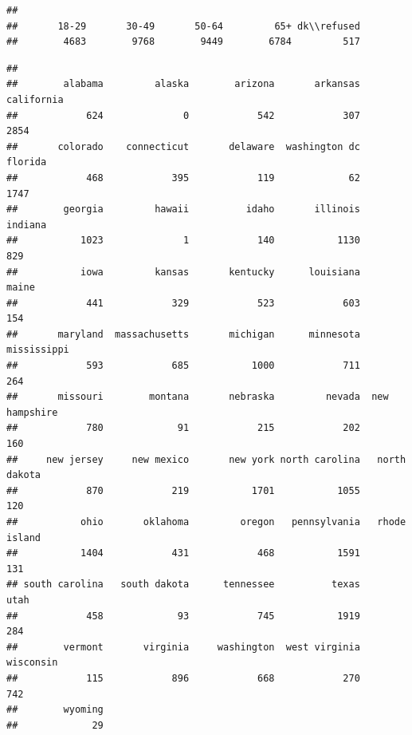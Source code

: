 \documentclass[
]{book}
\newenvironment{Shaded}{\begin{snugshade}}{\end{snugshade}}
\newcommand{\DocumentationTok}[1]{\textcolor[rgb]{0.56,0.35,0.01}{\textbf{\textit{#1}}}}
\newcommand{\FunctionTok}[1]{\textcolor[rgb]{0.00,0.00,0.00}{#1}}
\newcommand{\NormalTok}[1]{#1}
\newcommand{\SpecialCharTok}[1]{\textcolor[rgb]{0.00,0.00,0.00}{#1}}
\theoremstyle{definition}
\theoremstyle{definition}
\theoremstyle{definition}
\theoremstyle{definition}
\theoremstyle{remark}
\begin{document}
\begin{Shaded}
\end{Shaded}

\begin{verbatim}
## 
##       18-29       30-49       50-64         65+ dk\\refused 
##        4683        9768        9449        6784         517
\end{verbatim}

\begin{Shaded}
\end{Shaded}

\begin{verbatim}
## 
##        alabama         alaska        arizona       arkansas     california 
##            624              0            542            307           2854 
##       colorado    connecticut       delaware  washington dc        florida 
##            468            395            119             62           1747 
##        georgia         hawaii          idaho       illinois        indiana 
##           1023              1            140           1130            829 
##           iowa         kansas       kentucky      louisiana          maine 
##            441            329            523            603            154 
##       maryland  massachusetts       michigan      minnesota    mississippi 
##            593            685           1000            711            264 
##       missouri        montana       nebraska         nevada  new hampshire 
##            780             91            215            202            160 
##     new jersey     new mexico       new york north carolina   north dakota 
##            870            219           1701           1055            120 
##           ohio       oklahoma         oregon   pennsylvania   rhode island 
##           1404            431            468           1591            131 
## south carolina   south dakota      tennessee          texas           utah 
##            458             93            745           1919            284 
##        vermont       virginia     washington  west virginia      wisconsin 
##            115            896            668            270            742 
##        wyoming 
##             29
\end{verbatim}
\end{document}
